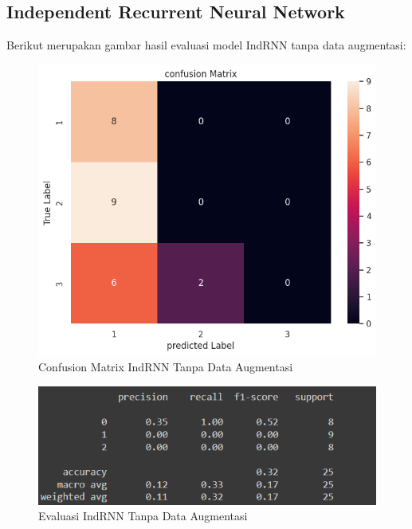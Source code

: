 \subsection{Independent Recurrent Neural Network}

Berikut merupakan gambar hasil evaluasi model IndRNN tanpa data augmentasi:
\newpage
\begin{figure} [H] \centering
  \includegraphics[scale=0.8]{gambar/CMIndRNNnoaug.png}
  \caption{Confusion Matrix IndRNN Tanpa Data Augmentasi}
  \label{fig:CMIndRNNnoaug}
\end{figure}

\begin{figure} [H] \centering
  \includegraphics[scale=0.95]{gambar/scoreIndRNNnoaug.png}
  \caption{Evaluasi IndRNN Tanpa Data Augmentasi}
  \label{fig:ScoreIndRNNnoaug}
\end{figure}

